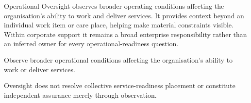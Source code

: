 Operational Oversight observes broader operating conditions affecting the organisation's ability to work and deliver services. It provides context beyond an individual work item or care place, helping make material constraints visible. Within corporate support it remains a broad enterprise responsibility rather than an inferred owner for every operational-readiness question.



Observe broader operational conditions affecting the organisation’s ability to work or deliver services.



Oversight does not resolve collective service-readiness placement or constitute independent assurance merely through observation.


